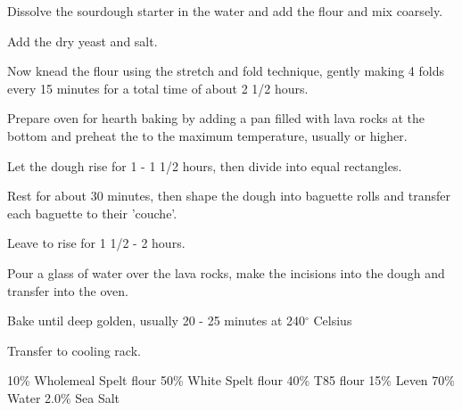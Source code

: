 \begin{method}
Dissolve the sourdough starter in the water and add the flour and mix coarsely.

Add the dry yeast and salt.

Now knead the flour using the stretch and fold technique, gently making 4 folds  every 15 minutes for a total time of about 2 1/2 hours.

Prepare oven for hearth baking by adding a pan filled with lava rocks at the bottom and preheat the to the maximum temperature, usually  or higher.

Let the dough rise for 1 - 1 1/2 hours, then divide into equal rectangles.

Rest for about 30 minutes, then shape the dough into baguette rolls and transfer each baguette to their 'couche'.

Leave to rise for 1 1/2 - 2 hours.

Pour a glass of water over the lava rocks, make the incisions into the dough and transfer into the oven.

Bake until deep golden,  usually 20 - 25 minutes at 240$^{\circ}$ Celsius

Transfer to cooling rack.

\end {method}

\label{rec:spelt-loaf}

\begin{ingreds}
	10\% Wholemeal Spelt flour
	50\% White Spelt flour
	40\% T85 flour
	15\% Leven
	70\% Water
	2.0\% Sea Salt

\end{ingreds}

